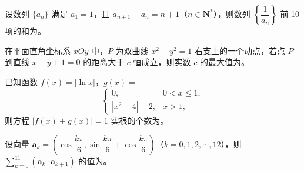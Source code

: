 \begin{question}
设数列 \(\{a_{n}\}\) 满足 \(a_{1}=1\)，且 \(a_{n+1}-a_{n}=n+1\)（\(n\in\mathbf{N}^{*}\)），则数列 \(\left\{\dfrac{1}{a_{n}}\right\}\) 前 10 项的和为\gkblank{}。

\end{question}
\begin{question}
在平面直角坐标系 \(xOy\) 中，\(P\) 为双曲线 \(x^{2}-y^{2}=1\) 右支上的一个动点，若点 \(P\) 到直线 \(x-y+1=0\) 的距离大于 \(c\) 恒成立，则实数 \(c\) 的最大值为\gkblank{}。

\end{question}
\begin{question}
已知函数 \(f(x)=|\ln x|\)，\(g(x)=\)
\nopagebreak[4]
\[
\begin{cases}
0, & 0<x\leqslant 1,\\
|x^{2}-4|-2, & x>1,
\end{cases}
\]
则方程 \(|f(x)+g(x)|=1\) 实根的个数为\gkblank{}。

\end{question}
\begin{question}
设向量 \(\boldsymbol a_{k}=\left(\cos\dfrac{k\pi}{6},\sin\dfrac{k\pi}{6}+\cos\dfrac{k\pi}{6}\right)\)（\(k=0,1,2,\cdots,12\)），则 \(\sum\limits_{k=0}^{11}(\boldsymbol a_{k}\cdot\boldsymbol a_{k+1})\) 的值为\gkblank{}。

\end{question}

